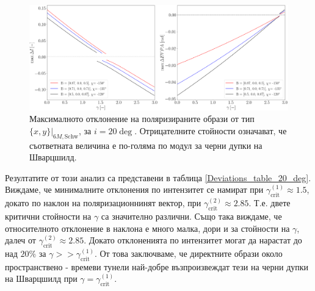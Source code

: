 \begin{figure}[!htb]
		\centering
		\includegraphics[scale = 0.22]{WH_20_deg_param_sweep.png}
		\caption[Максималното отклонение на поляризираните образи от тип $\{x,y\}\vert_{6M, \text{Schw}}$, за $i = 20\deg$]{Максималното отклонение на поляризираните образи от тип $\{x,y\}\vert_{6M, \text{Schw}}$, за $i = 20\deg$. Отрицателните стойности означават, че съответната величина е по-голяма по модул за черни дупки на Шварцшилд.} 
		\label{WH_max_deviation_20_deg}
\end{figure}
 Резултатите от този анализ са представени в таблица \ref{Deviations_table_20_deg}. Виждаме, че минималните отклонения по интензитет се намират при $\gamma_\text{crit}^{(1)}\approx 1.5$, докато по наклон на поляризационнинят вектор, при $\gamma_\text{crit}^{(2)}\approx 2.85$. Т.е. двете критични стойности на $\gamma$ са значително различни. Също така виждаме, че относителното отклонение в наклона е много малка, дори и за стойности на $\gamma$, далеч от $\gamma_\text{crit}^{(2)}\approx 2.85$. Докато отклоненията по интензитет могат да нарастат до над $20\%$ за $\gamma >> \gamma_\text{crit}^{(1)}$. От това заключваме, че директните образи около пространствено - времеви тунели най-добре възпроизвеждат тези на черни дупки на Шварцшилд при $\gamma = \gamma_\text{crit}^{(1)}$.

